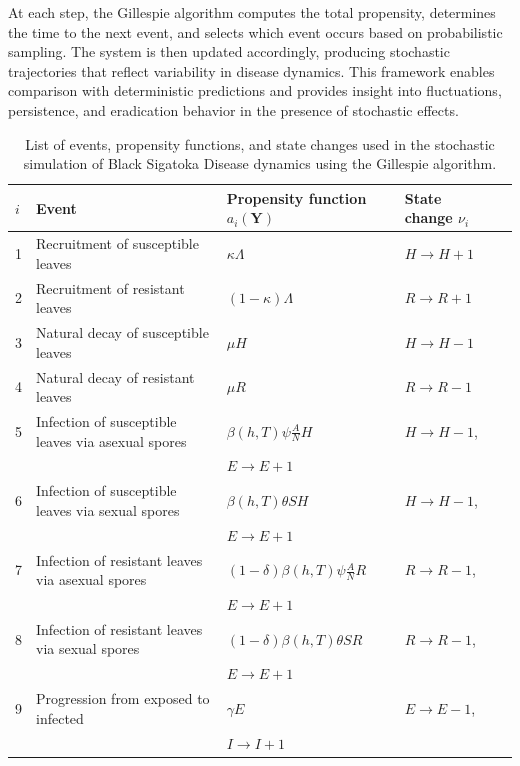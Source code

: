 \documentclass[11pt]{article}
\newcommand\bfY{\mathbf{Y}}
\numberwithin{equation}{section}
\begin{document}
At each step, the Gillespie algorithm computes the total propensity, determines the time to the next event, and selects which event occurs based on probabilistic sampling. The system is then updated accordingly, producing stochastic trajectories that reflect variability in disease dynamics. This framework enables comparison with deterministic predictions and provides insight into fluctuations, persistence, and eradication behavior in the presence of stochastic effects.

\begin{table}[!ht]
    \caption{List of events, propensity functions, and state changes used in the stochastic simulation of Black Sigatoka Disease dynamics using the Gillespie algorithm.}
    \label{table4}
    \begin{tabular}{lllll@{}}
        \toprule
         $i$ & Event & Propensity function $a_i(\bfY)$ & State change $\nu_i$ \\
        \midrule
        1 & Recruitment of susceptible leaves & $\kappa \Lambda$ & $H \rightarrow H + 1$\\
        2 & Recruitment of resistant leaves & $(1 - \kappa)\Lambda$  & $R \rightarrow R + 1$\\
        3 & Natural decay of susceptible leaves & $\mu H$  & $H \rightarrow H - 1$\\
        4 & Natural decay of resistant leaves & $\mu R$ & $R\rightarrow R-1$\\
        5 & Infection of susceptible leaves via asexual spores & $\beta(h,T)\psi\frac{A}{N}H$ & $H\rightarrow H-1$,\\
        &&$E\rightarrow E+1$\\
        6 & Infection of susceptible leaves via sexual spores & $\beta(h,T)\theta SH$ & $H\rightarrow H-1$,\\ 
        &&$E\rightarrow E+1$\\
        7 & Infection of resistant leaves via asexual spores & $(1-\delta)\beta(h,T)\psi\frac{A}{N}R$ & $R\rightarrow R-1$,\\ 
        &&$E\rightarrow E+1$\\
        8 & Infection of resistant leaves via sexual spores & $(1-\delta)\beta(h,T)\theta SR$ & $R\rightarrow R-1$,\\ 
        &&$E\rightarrow E+1$\\
        9 & Progression from exposed to infected & $\gamma E$ & $E\rightarrow E-1$,\\ 
        &&$I\rightarrow I+1$\\

\end{tabular}
\end{table}
\end{document}
